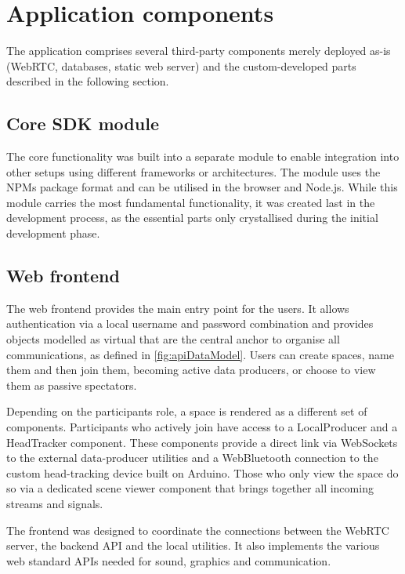 \section{Application components}
\label{sec:application-components}

The application comprises several third-party components merely deployed as-is (WebRTC, databases, static web server) and the custom-developed parts described in the following section.

\subsection{Core SDK module}

The core functionality was built into a separate module to enable integration into other setups using different frameworks or architectures.
The module uses the \ac{NPM}\textquotesingle s package format and can be utilised in the browser and Node.js.
While this module carries the most fundamental functionality, it was created last in the development process, as the essential parts only crystallised during the initial development phase.

\subsection{Web frontend}

The web frontend provides the main entry point for the users.
It allows authentication via a local username and password combination and provides objects modelled as virtual  that are the central anchor to organise all communications, as defined in \autoref{fig:apiDataModel}.
Users can create spaces, name them and then join them, becoming active data producers, or choose to view them as passive spectators.

Depending on the participant\textquotesingle s role, a space is rendered as a different set of components.
Participants who actively join have access to a LocalProducer and a HeadTracker component.
These components provide a direct link via WebSockets to the external data-producer utilities and a WebBluetooth connection to the custom head-tracking device built on Arduino.
Those who only view the space do so via a dedicated scene viewer component that brings together all incoming streams and signals.

The frontend was designed to coordinate the connections between the WebRTC server, the backend \ac{API} and the local utilities.
It also implements the various web standard \ac{API}s needed for sound, graphics and communication.

